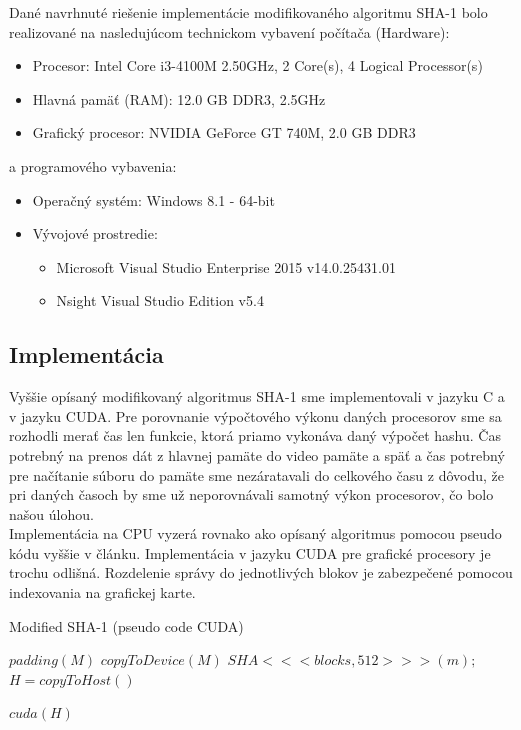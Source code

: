 \documentclass[conference]{IEEEtran}
\begin{document}
Dané navrhnuté riešenie implementácie modifikovaného algoritmu SHA-1 bolo realizované na nasledujúcom technickom vybavení počítača (Hardware):

\begin{itemize}
	\item{Procesor: Intel Core i3-4100M 2.50GHz, 2 Core(s), 4 Logical Processor(s)}
	\item{Hlavná pamäť (RAM): 12.0 GB DDR3, 2.5GHz}
	\item{Grafický procesor: NVIDIA GeForce GT 740M, 2.0 GB DDR3}
\end{itemize}

a programového vybavenia:

\begin{itemize}
	\item{Operačný systém: Windows 8.1 - 64-bit}
	\item{Vývojové prostredie:}
	\begin{itemize}
		\item{Microsoft Visual Studio Enterprise 2015 v14.0.25431.01}
		\item{Nsight Visual Studio Edition v5.4}
	\end{itemize}
\end{itemize}

\subsection{Implementácia}

Vyššie opísaný modifikovaný algoritmus SHA-1 sme implementovali v jazyku C a v jazyku CUDA. Pre porovnanie výpočtového výkonu daných procesorov sme sa rozhodli merať čas len funkcie, ktorá priamo vykonáva daný výpočet hashu. Čas potrebný na prenos dát z hlavnej pamäte do video pamäte a späť a čas potrebný pre načítanie súboru do pamäte sme nezáratavali do celkového času z dôvodu, že pri daných časoch by sme už neporovnávali samotný výkon procesorov, čo bolo našou úlohou.\\
Implementácia na CPU vyzerá rovnako ako opísaný algoritmus pomocou pseudo kódu vyššie v článku. Implementácia v jazyku CUDA pre grafické procesory je trochu odlišná. Rozdelenie správy do jednotlivých blokov je zabezpečené pomocou indexovania na grafickej karte.

\begin{algorithm}
   \caption{Modified SHA-1 (pseudo code CUDA)}
    \begin{algorithmic}[1]
        	\State ${padding(M)}$ 
        	\State ${copyToDevice(M)}$ 
     	\State ${SHA<<< blocks, 512 >>> (m);}$ 
     	\State ${H = copyToHost()}$ 	
   	
   	 ${cuda(H)}$
   	\EndIf
       \EndFunction
\end{algorithmic}
\end{algorithm}
\end{document}
